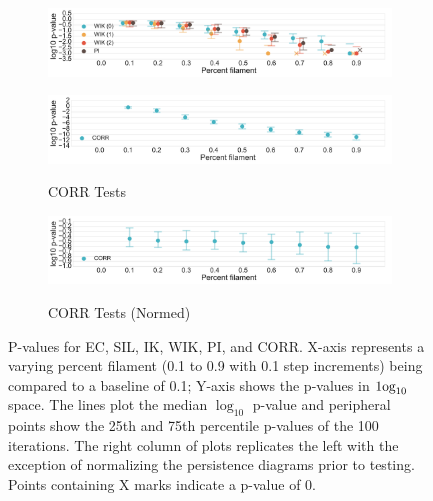 \documentclass[12pt]{article}
\begin{document}
\begin{description}
\begin{center}
\begin{figure}[htp!]
\begin{subfigure}{.45\textwidth}
        \includegraphics[width=\linewidth]{figure_8_all_weighted_contour_group_normed.pdf}
        \label{fig:all_weight_normed}
      \end{subfigure}
      \begin{subfigure}{.45\textwidth}
        \caption{CORR Tests}
        \includegraphics[width=\linewidth]{figure_8_all_correlation_group.pdf}
        \label{fig:all_corr}
      \end{subfigure}
      \begin{subfigure}{.45\textwidth}
        \caption{CORR Tests (Normed)}
        \includegraphics[width=\linewidth]{figure_8_all_correlation_group_normed.pdf}
        \label{fig:all_corr_normed}
      \end{subfigure}
      \caption{P-values for EC, SIL, IK, WIK, PI, and CORR. X-axis represents a varying percent filament (0.1 to 0.9 with 0.1 step increments) being compared to a baseline of 0.1; Y-axis shows the p-values in $\textup{1og}_{10}$ space. The lines plot the median $\log_{10}$ p-value and peripheral points show the 25th and 75th percentile p-values of the 100 iterations. The right column of plots replicates the left with the exception of normalizing the persistence diagrams prior to testing. Points containing X marks indicate a p-value of 0.}
      \label{fig:linesUnnormApp}
    \end{figure}
  \end{center}
\end{description}




\end{document}
